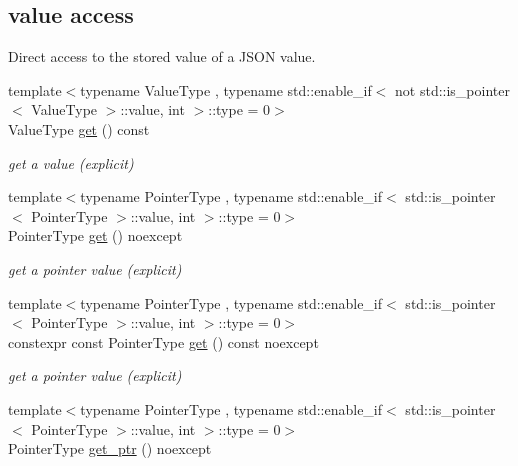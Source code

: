 \subsection*{value access}
\label{_amgrpd8f53c9caf18314e5b3f758245606995}%
Direct access to the stored value of a J\+S\+O\+N value. \begin{DoxyCompactItemize}
\item 
{\footnotesize template$<$typename Value\+Type , typename std\+::enable\+\_\+if$<$                                                              not std\+::is\+\_\+pointer$<$ Value\+Type $>$\+::value, int $>$\+::type  = 0$>$ }\\Value\+Type \hyperlink{classnlohmann_1_1basic__json_a20bfb2ca6d4c421c74bb3e53328cd437}{get} () const 
\begin{DoxyCompactList}\small\item\em get a value (explicit) \end{DoxyCompactList}\item 
{\footnotesize template$<$typename Pointer\+Type , typename std\+::enable\+\_\+if$<$                                                              std\+::is\+\_\+pointer$<$ Pointer\+Type $>$\+::value, int $>$\+::type  = 0$>$ }\\Pointer\+Type \hyperlink{classnlohmann_1_1basic__json_ac5693cff1df0775cd3fbe960412cde4b}{get} () noexcept
\begin{DoxyCompactList}\small\item\em get a pointer value (explicit) \end{DoxyCompactList}\item 
{\footnotesize template$<$typename Pointer\+Type , typename std\+::enable\+\_\+if$<$                                                              std\+::is\+\_\+pointer$<$ Pointer\+Type $>$\+::value, int $>$\+::type  = 0$>$ }\\constexpr const Pointer\+Type \hyperlink{classnlohmann_1_1basic__json_a363da77bc39cae041d59ee334ac4f41b}{get} () const  noexcept
\begin{DoxyCompactList}\small\item\em get a pointer value (explicit) \end{DoxyCompactList}\item 
{\footnotesize template$<$typename Pointer\+Type , typename std\+::enable\+\_\+if$<$                                                              std\+::is\+\_\+pointer$<$ Pointer\+Type $>$\+::value, int $>$\+::type  = 0$>$ }\\Pointer\+Type \hyperlink{classnlohmann_1_1basic__json_a7ab11375ed2e29c2fcb6119386851445}{get\+\_\+ptr} () noexcept

\end{DoxyCompactItemize}
